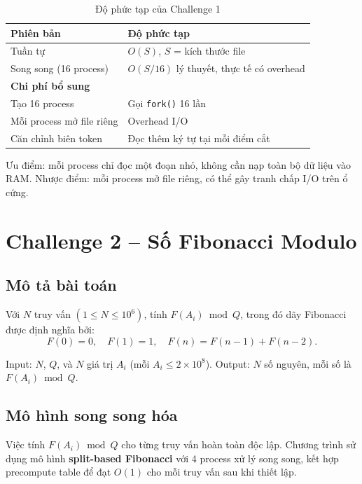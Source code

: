 \documentclass[12pt,a4paper]{article}
\begin{document}
\begin{table}[H]
\centering
\caption{Độ phức tạp của Challenge 1}
\begin{tabularx}{0.85\textwidth}{p{4cm}Y}
\toprule
\textbf{Phiên bản} & \textbf{Độ phức tạp} \\
\midrule
Tuần tự & $O(S)$, $S$ = kích thước file \\
Song song (16 process) & $O(S/16)$ lý thuyết, thực tế có overhead \\
\midrule
\textbf{Chi phí bổ sung} & \\
\midrule
Tạo 16 process & Gọi \texttt{fork()} 16 lần \\
Mỗi process mở file riêng & Overhead I/O \\
Căn chỉnh biên token & Đọc thêm ký tự tại mỗi điểm cắt \\
\bottomrule
\end{tabularx}
\end{table}

Ưu điểm: mỗi process chỉ đọc một đoạn nhỏ, không cần nạp toàn bộ dữ liệu vào RAM. Nhược điểm: mỗi process mở file riêng, có thể gây tranh chấp I/O trên ổ cứng.

\section{Challenge 2 -- Số Fibonacci Modulo}

\subsection{Mô tả bài toán}

Với $N$ truy vấn $(1 \leq N \leq 10^6)$, tính $F(A_i) \bmod Q$, trong đó dãy Fibonacci được định nghĩa bởi:
\[
F(0)=0,\quad F(1)=1,\quad F(n)=F(n-1)+F(n-2).
\]

Input: $N$, $Q$, và $N$ giá trị $A_i$ (mỗi $A_i \leq 2 \times 10^8$). Output: $N$ số nguyên, mỗi số là $F(A_i) \bmod Q$.

\subsection{Mô hình song song hóa}

Việc tính $F(A_i) \bmod Q$ cho từng truy vấn hoàn toàn độc lập. Chương trình sử dụng mô hình \textbf{split-based Fibonacci} với 4 process xử lý song song, kết hợp precompute table để đạt $O(1)$ cho mỗi truy vấn sau khi thiết lập.
\end{document}
